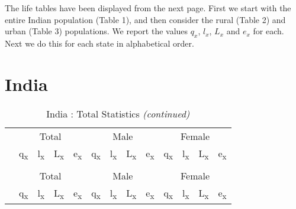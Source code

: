 \documentclass[
  14pt,
]{article}
\begin{document}
The life tables have been displayed from the next page. First we start
with the entire Indian population (Table 1), and then consider the rural
(Table 2) and urban (Table 3) populations. We report the values \(q_x\),
\(l_x\), \(L_x\) and \(e_x\) for each. Next we do this for each state in
alphabetical order.

\pagebreak

\hypertarget{india}{%
\section{India}\label{india}}

\begin{longtable}[t]{lcccccccccccc}
\caption{\label{tab:unnamed-chunk-1}India : Total Statistics}\\
\toprule
\multicolumn{1}{c}{ } & \multicolumn{4}{c}{Total} & \multicolumn{4}{c}{Male} & \multicolumn{4}{c}{Female} \\
\cmidrule(l{3pt}r{3pt}){2-5} \cmidrule(l{3pt}r{3pt}){6-9} \cmidrule(l{3pt}r{3pt}){10-13}
  & q\textsubscript{x} & l\textsubscript{x} & L\textsubscript{x} & e\textsubscript{x} & q\textsubscript{x} & l\textsubscript{x} & L\textsubscript{x} & e\textsubscript{x} & q\textsubscript{x} & l\textsubscript{x} & L\textsubscript{x} & e\textsubscript{x}\\
\midrule
\endfirsthead
\caption[]{India : Total Statistics \textit{(continued)}}\\
\toprule
\multicolumn{1}{c}{ } & \multicolumn{4}{c}{Total} & \multicolumn{4}{c}{Male} & \multicolumn{4}{c}{Female} \\
\cmidrule(l{3pt}r{3pt}){2-5} \cmidrule(l{3pt}r{3pt}){6-9} \cmidrule(l{3pt}r{3pt}){10-13}
  & q\textsubscript{x} & l\textsubscript{x} & L\textsubscript{x} & e\textsubscript{x} & q\textsubscript{x} & l\textsubscript{x} & L\textsubscript{x} & e\textsubscript{x} & q\textsubscript{x} & l\textsubscript{x} & L\textsubscript{x} & e\textsubscript{x}\\
\midrule
\endhead


\end{longtable}
\end{document}
